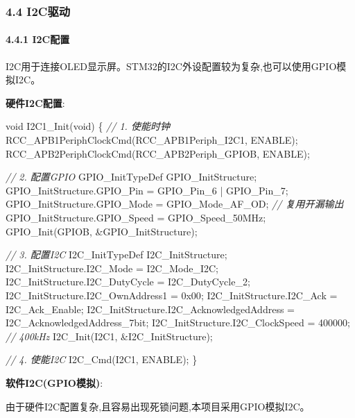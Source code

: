 \documentclass[
]{article}
\newenvironment{Shaded}{}{}
\newcommand{\BaseNTok}[1]{\textcolor[rgb]{0.25,0.63,0.44}{#1}}
\newcommand{\CommentTok}[1]{\textcolor[rgb]{0.38,0.63,0.69}{\textit{#1}}}
\newcommand{\DataTypeTok}[1]{\textcolor[rgb]{0.56,0.13,0.00}{#1}}
\newcommand{\DecValTok}[1]{\textcolor[rgb]{0.25,0.63,0.44}{#1}}
\newcommand{\NormalTok}[1]{#1}
\begin{document}
\hypertarget{i2cux9a71ux52a8}{%
\subsubsection{4.4 I2C驱动}\label{i2cux9a71ux52a8}}

\hypertarget{i2cux914dux7f6e}{%
\paragraph{4.4.1 I2C配置}\label{i2cux914dux7f6e}}

I2C用于连接OLED显示屏。STM32的I2C外设配置较为复杂,也可以使用GPIO模拟I2C。

\textbf{硬件I2C配置}:

\begin{Shaded}
\begin{Highlighting}[]
\DataTypeTok{void}\NormalTok{ I2C1\_Init(}\DataTypeTok{void}\NormalTok{)}
\NormalTok{\{}
    \CommentTok{// 1. 使能时钟}
\NormalTok{    RCC\_APB1PeriphClockCmd(RCC\_APB1Periph\_I2C1, ENABLE);}
\NormalTok{    RCC\_APB2PeriphClockCmd(RCC\_APB2Periph\_GPIOB, ENABLE);}
    
    \CommentTok{// 2. 配置GPIO}
\NormalTok{    GPIO\_InitTypeDef GPIO\_InitStructure;}
\NormalTok{    GPIO\_InitStructure.GPIO\_Pin = GPIO\_Pin\_6 | GPIO\_Pin\_7;}
\NormalTok{    GPIO\_InitStructure.GPIO\_Mode = GPIO\_Mode\_AF\_OD;  }\CommentTok{// 复用开漏输出}
\NormalTok{    GPIO\_InitStructure.GPIO\_Speed = GPIO\_Speed\_50MHz;}
\NormalTok{    GPIO\_Init(GPIOB, \&GPIO\_InitStructure);}
    
    \CommentTok{// 3. 配置I2C}
\NormalTok{    I2C\_InitTypeDef I2C\_InitStructure;}
\NormalTok{    I2C\_InitStructure.I2C\_Mode = I2C\_Mode\_I2C;}
\NormalTok{    I2C\_InitStructure.I2C\_DutyCycle = I2C\_DutyCycle\_2;}
\NormalTok{    I2C\_InitStructure.I2C\_OwnAddress1 = }\BaseNTok{0x00}\NormalTok{;}
\NormalTok{    I2C\_InitStructure.I2C\_Ack = I2C\_Ack\_Enable;}
\NormalTok{    I2C\_InitStructure.I2C\_AcknowledgedAddress = I2C\_AcknowledgedAddress\_7bit;}
\NormalTok{    I2C\_InitStructure.I2C\_ClockSpeed = }\DecValTok{400000}\NormalTok{;  }\CommentTok{// 400kHz}
\NormalTok{    I2C\_Init(I2C1, \&I2C\_InitStructure);}
    
    \CommentTok{// 4. 使能I2C}
\NormalTok{    I2C\_Cmd(I2C1, ENABLE);}
\NormalTok{\}}
\end{Highlighting}
\end{Shaded}

\textbf{软件I2C(GPIO模拟)}:

由于硬件I2C配置复杂,且容易出现死锁问题,本项目采用GPIO模拟I2C。
\end{document}
